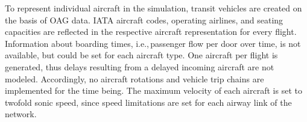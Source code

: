%



To represent individual aircraft in the simulation, transit vehicles are created on the basis of OAG data. 
IATA aircraft codes, operating airlines, and seating capacities are reflected in the respective aircraft representation for every flight. 
Information about boarding times, i.e.,\,passenger flow per door over time, is not available, but could be set for each aircraft type. 
One aircraft per flight is generated, thus delays resulting from a delayed incoming aircraft are not modeled.
Accordingly, no aircraft rotations and vehicle trip chains are implemented for the time being. 
The maximum velocity of each aircraft is set to twofold sonic speed, since speed limitations are set for each airway link of the network. 



